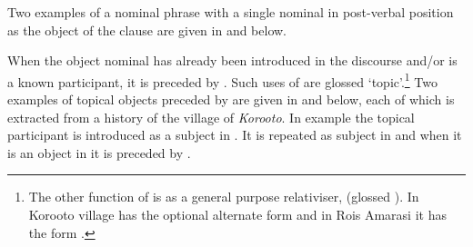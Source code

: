 Two examples of a nominal phrase with a single nominal in post-verbal position
as the object of the clause are given in
 and  below.

\begin{exe}
	\label{ex:130914-2, 0.46}
	\label{ex:130902-1, 4.32}
\end{exe}

When the object nominal has already been introduced
in the discourse and/or is a known participant,
it is preceded by .
Such uses of  are glossed {\reqt} `topic'.\footnote{
		The other function of  is as a general purpose relativiser, (glossed {\req}).
		In Koro{\Q}oto village  has the optional alternate form 
		and in Ro{\Q}is Amarasi it has the form .}
Two examples of topical objects preceded by 
are given in  and  below,
each of which is extracted from a history of the village of \emph{Koro{\Q}oto}.
In example  the topical participant
is introduced as a subject in .
It is repeated as subject in 
and when it is an object in  it is preceded by .

